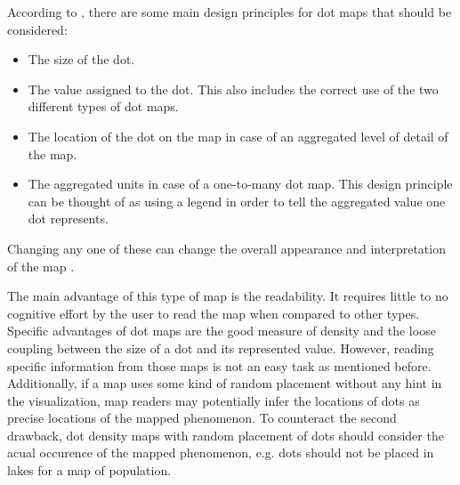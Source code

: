 According to \citeauthor{Tyner2010}, there are some main design principles for dot maps that should be considered:
\begin{itemize}
\item The size of the dot.
\item The value assigned to the dot. This also includes the correct use of the two different types of dot maps.
\item The location of the dot on the map in case of an aggregated level of detail of the map.
\item The aggregated units in case of a one-to-many dot map. This design principle can be thought of as using a legend in order to tell the aggregated value one dot represents.
\end{itemize}
Changing any one of these can change the overall appearance and interpretation of the map .

The main advantage of this type of map is the readability. It requires little to no cognitive effort by the user to read the map when compared to other types. Specific advantages of dot maps are the good measure of density and the loose coupling between the size of a dot and its represented value.
However, reading specific information from those maps is not an easy task as mentioned before. Additionally, if a map uses some kind of random placement without any hint in the visualization, map readers may potentially infer the locations of dots as precise locations of the mapped phenomenon. To counteract the second drawback, dot density maps with random placement of dots should consider the acual occurence of the mapped phenomenon, e.g. dots should not be placed in lakes for a map of population.